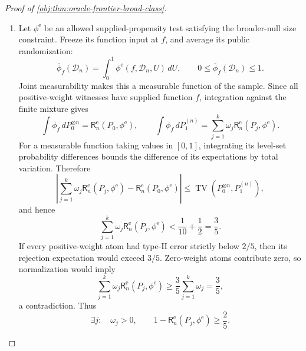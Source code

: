 \documentclass[11pt]{article}
\begin{document}
\begin{proof}[Proof of \cref{obj:thm:oracle-frontier-broad-class}]
\begin{enumerate}
Admissibility gives \(q>0\), \(\gamma>0\), and hence \(E_0>0\). Consequently,
\[
0<r_{\mathrm{low}}
\le d(P_j)<d_0\le D_v^{\mathrm{e,br}}
\qquad(\omega_j>0).
\]
In particular, \(r_{\mathrm{low}}\) is a legal separation with a nonempty alternative class.

\item Let \(\phi^{\mathrm e}\) be an allowed supplied-propensity test satisfying the broader-null size constraint. Freeze its function input at \(f\), and average its public randomization:
\[
\overline\phi_f(\mathcal D_n)
=\int_0^1\phi^{\mathrm e}(f,\mathcal D_n,U)\,dU,
\qquad
0\le\overline\phi_f(\mathcal D_n)\le1.
\]
Joint measurability makes this a measurable function of the sample. Since all positive-weight witnesses have supplied function \(f\), integration against the finite mixture gives
\[
\int\overline\phi_f\,dP_0^{\otimes n}
=\mathsf R_n^{\mathrm e}(P_0,\phi^{\mathrm e}),
\qquad
\int\overline\phi_f\,d\overline P_1^{(n)}
=\sum_{j=1}^k\omega_j\mathsf R_n^{\mathrm e}(P_j,\phi^{\mathrm e}).
\]
For a measurable function taking values in \([0,1]\), integrating its level-set probability differences bounds the difference of its expectations by total variation. Therefore
\[
\left|
\sum_{j=1}^k\omega_j\mathsf R_n^{\mathrm e}(P_j,\phi^{\mathrm e})
-\mathsf R_n^{\mathrm e}(P_0,\phi^{\mathrm e})
\right|
\le
\operatorname{TV}\!\left(P_0^{\otimes n},\overline P_1^{(n)}\right),
\]
and hence
\[
\sum_{j=1}^k\omega_j\mathsf R_n^{\mathrm e}(P_j,\phi^{\mathrm e})
<\frac1{10}+\frac12=\frac35.
\]
If every positive-weight atom had type-II error strictly below \(2/5\), then its rejection expectation would exceed \(3/5\). Zero-weight atoms contribute zero, so normalization would imply
\[
\sum_{j=1}^k\omega_j\mathsf R_n^{\mathrm e}(P_j,\phi^{\mathrm e})
\ge\frac35\sum_{j=1}^k\omega_j
=\frac35,
\]
a contradiction. Thus
\[
\exists j:\quad
\omega_j>0,\qquad
1-\mathsf R_n^{\mathrm e}(P_j,\phi^{\mathrm e})\ge\frac25.
\]


\end{enumerate}
\end{proof}
\end{document}
